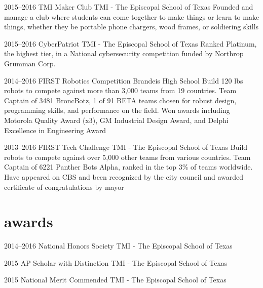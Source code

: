 \documentclass[print]{friggeri-cv} %
\begin{document}
\begin{entrylist}
	
	
	\entry
	{2015--2016}
	{TMI Maker Club}
	{TMI - The Episcopal School of Texas}
	{Founded and manage a club where students can come together to make things or learn to make things, whether they be portable phone chargers, wood frames, or soldiering skills}
	
	
	
	\entry
	{2015--2016}
	{CyberPatriot}
	{TMI - The Episcopal School of Texas}
	{Ranked Platinum, the highest tier, in a National cybersecurity competition funded by Northrop Grumman Corp.}
	
	
	\entry
	{2014--2016}
	{FIRST Robotics Competition}
	{Brandeis High School}
	{Build 120 lbs robots to compete against more than 3,000 teams from 19 countries. Team Captain of 3481 BroncBotz, 1 of 91 BETA teams chosen for robust design, programming skills, and performance on the field. Won awards including Motorola Quality Award (x3), GM Industrial Design Award, and Delphi Excellence in Engineering Award}
	
	
	\entry
	{2013--2016}
	{FIRST Tech Challenge}
	{TMI - The Episcopal School of Texas}
	{Build robots to compete against over 5,000 other teams from various countries. Team Captain of 6221 Panther Bots Alpha, ranked in the top 3\% of teams worldwide. Have appeared on CBS and been recognized by the city council and awarded certificate of congratulations by mayor}
	
	
\end{entrylist}

\section{awards}

\begin{entrylist}
	
	
	\vspace{-10pt}
	\entry
	{2014--2016}
	{National Honors Society}
	{TMI - The Episcopal School of Texas}
	
	
	\vspace{-10pt}
	\entry
	{2015}
	{AP Scholar with Distinction}
	{TMI - The Episcopal School of Texas}
	
	
	\vspace{-10pt}
	\entry
	{2015}
	{National Merit Commended}
	{TMI - The Episcopal School of Texas}
	
		
\end{entrylist}
\end{document}
